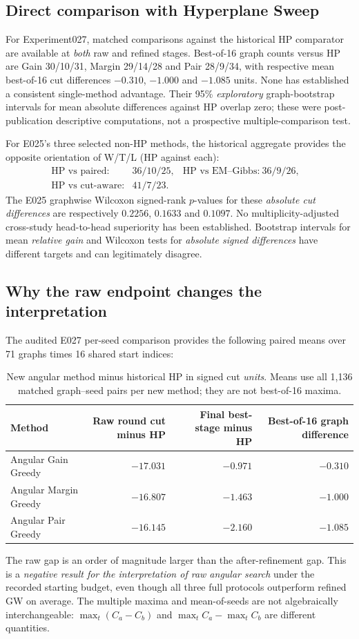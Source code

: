 \subsection{Direct comparison with Hyperplane Sweep}
For Experiment027, matched comparisons against the historical HP comparator are available at \emph{both} raw and refined stages. Best-of-16 graph counts versus HP are Gain 30/10/31, Margin 29/14/28 and Pair 28/9/34, with respective mean best-of-16 cut differences $-0.310$, $-1.000$ and $-1.085$ units. None has established a consistent single-method advantage. Their 95\% \emph{exploratory} graph-bootstrap intervals for mean absolute differences against HP overlap zero; these were post-publication descriptive computations, not a prospective multiple-comparison test.

For E025's three selected non-HP methods, the historical aggregate provides the opposite orientation of W/T/L (HP against each):
\[
\begin{array}{lll}
\text{HP vs paired:}&36/10/25,&
\text{HP vs EM--Gibbs:}\ 36/9/26,\\
\text{HP vs cut-aware:}&41/7/23.&&
\end{array}
\]
The E025 graphwise Wilcoxon signed-rank $p$-values for these \emph{absolute cut differences} are respectively $0.2256$, $0.1633$ and $0.1097$. No multiplicity-adjusted cross-study head-to-head superiority has been established. Bootstrap intervals for mean \emph{relative gain} and Wilcoxon tests for \emph{absolute signed differences} have different targets and can legitimately disagree.

\subsection{Why the raw endpoint changes the interpretation}
The audited E027 per-seed comparison provides the following paired means over 71 graphs times 16 shared start indices:
\begin{table}[tb]
\centering\small
\caption{New angular method minus historical HP in signed cut \emph{units}. Means use all 1,136 matched graph--seed pairs per new method; they are not best-of-16 maxima.}\label{tab:raw}
\begin{tabular}{@{}lrrr@{}}
\toprule
Method & Raw round cut minus HP & Final best-stage minus HP & Best-of-16 graph difference\\
\midrule
Angular Gain Greedy   & $-17.031$ & $-0.971$ & $-0.310$\\
Angular Margin Greedy & $-16.807$ & $-1.463$ & $-1.000$\\
Angular Pair Greedy   & $-16.145$ & $-2.160$ & $-1.085$\\
\bottomrule
\end{tabular}
\end{table}
The raw gap is an order of magnitude larger than the after-refinement gap. This is a \emph{negative result for the interpretation of raw angular search} under the recorded starting budget, even though all three full protocols outperform refined GW on average. The multiple maxima and mean-of-seeds are not algebraically interchangeable: $\max_t(C_a-C_b)$ and $\max_t C_a-\max_t C_b$ are different quantities.

